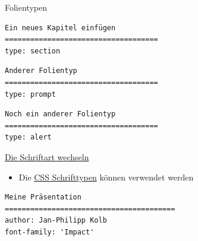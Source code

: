 \documentclass[ignorenonframetext,]{beamer}
\providecommand{\tightlist}{%
\setlength{\itemsep}{0pt}\setlength{\parskip}{0pt}}
\begin{document}
\begin{frame}[fragile]{Folientypen}

\begin{verbatim}
Ein neues Kapitel einfügen
====================================
type: section
\end{verbatim}

\begin{verbatim}
Anderer Folientyp
====================================
type: prompt
\end{verbatim}

\begin{verbatim}
Noch ein anderer Folientyp
====================================
type: alert
\end{verbatim}

\end{frame}

\begin{frame}[fragile]{\href{https://support.rstudio.com/hc/en-us/articles/200532307}{Die
Schriftart wechseln}}

\begin{itemize}
\tightlist
\item
  Die \href{https://www.w3schools.com/cssref/css_websafe_fonts.asp}{CSS
  Schrifttypen} können verwendet werden
\end{itemize}

\begin{verbatim}
Meine Präsentation
========================================
author: Jan-Philipp Kolb
font-family: 'Impact'
\end{verbatim}

\end{frame}
\end{document}
